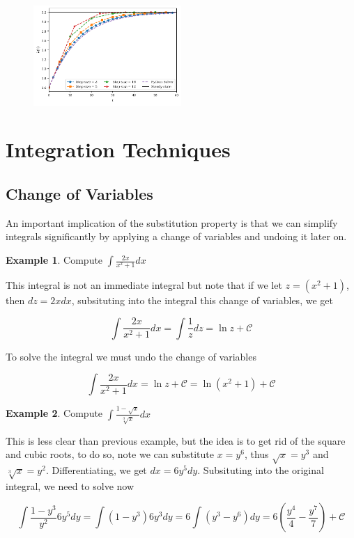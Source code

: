 \documentclass[a4paper,11pt]{article}
\theoremstyle{definition}
\newtheorem{example}{Example}
\theoremstyle{plain}
\begin{document}
\begin{figure}[htbp]
	\centering 
		\includegraphics[width = 0.5\textwidth]{Ch3_files/Ch3_34_0.pdf}
		\caption{}
		\label{fig:solow_convergence}
\end{figure}

\section{Integration Techniques}\label{integration-techniques}

\subsection{Change of Variables}\label{change-of-variables}

An important implication of the substitution property is that we can simplify integrals significantly by applying a change of variables and undoing it later on.

\begin{example}
Compute \(\int \frac{2x}{x^2+1} dx\)

This integral is not an immediate integral but note that if we let \(z = (x^2 + 1)\), then \(dz = 2xdx\), subsituting into the integral this change of variables, we get

\[
\int \frac{2x}{x^2+1} dx = \int \frac{1}{z} dz = \ln z + \mathcal{C}
\]

To solve the integral we must undo the change of variables

\[
\int \frac{2x}{x^2+1} dx = \ln z + \mathcal{C} = \ln\left(x^2 + 1\right) + \mathcal{C}
\]
\end{example}

\begin{example}
Compute \(\int \frac{1 - \sqrt{x}}{\sqrt[3]{x}} dx\)

This is less clear than previous example, but the idea is to get rid of the square and cubic roots, to do so, note we can substitute \(x = y^6\), thus \(\sqrt{x} = y^3\) and \(\sqrt[3]{x} = y^2\). Differentiating, we get \(dx = 6y^5 dy\). Subsituting into the original integral, we need to solve now

\[
\int \frac{1 - y^3}{y^2} 6y^5 dy = \int (1 - y^3)6y^3 dy = 6 \int (y^3 - y^6) dy = 6\left(\frac{y^4}{4} - \frac{y^7}{7}\right) + \mathcal{C}
\]
\end{example}
\end{document}
